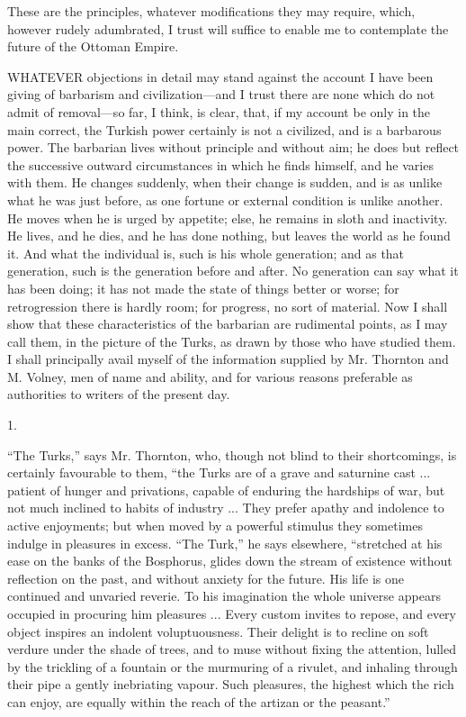 These are the principles,
whatever modifications they may require, which, however rudely
adumbrated, I trust will suffice to enable me to contemplate the
future of the Ottoman Empire.


WHATEVER
objections in detail may stand against the account I have been giving
of barbarism and civilization—and I trust there are none which do
not admit of removal—so far, I think, is clear, that, if my account
be only in the main correct, the Turkish power certainly is not a
civilized, and is a barbarous power. The barbarian lives without
principle and without aim; he does but reflect the successive outward
circumstances in which he finds himself, and he varies with them. He
changes suddenly, when their change is sudden, and is as unlike what
he was just before, as one fortune or external condition is unlike
another. He moves when he is urged by appetite; else, he remains in
sloth and inactivity. He lives, and he dies, and he has done nothing,
but leaves the world as he found it. And what the individual is, such
is his whole generation; and as that generation, such is the
generation before and after. No generation can say what it has been
doing; it has not made the state of things better or worse; for
retrogression there is hardly room; for progress, no sort of material.
Now I shall show that these characteristics of the barbarian are
rudimental points, as I may call them, in the picture of the Turks, as
drawn by those who have studied them. I shall principally avail myself
of the information supplied by Mr. Thornton and M. Volney, men
of name and ability, and for various reasons preferable as authorities
to writers of the present day.

1.

``The
Turks,'' says Mr. Thornton, who, though not blind to their
shortcomings, is certainly favourable to them, ``the Turks are of a
grave and saturnine cast ... patient of hunger and privations, capable
of enduring the hardships of war, but not much inclined to habits of
industry ... They prefer apathy and indolence to active enjoyments;
but when moved by a powerful stimulus they sometimes indulge in
pleasures in excess. ``The Turk,'' he says elsewhere, ``stretched at his
ease on the banks of the Bosphorus, glides down the stream of
existence without reflection on the past, and without anxiety for the
future. His life is one continued and unvaried reverie. To his
imagination the whole universe appears occupied in procuring him
pleasures ... Every custom invites to repose, and every object
inspires an indolent voluptuousness. Their delight is to recline on
soft verdure under the shade of trees, and to muse without fixing the
attention, lulled by the trickling of a fountain or the murmuring of a
rivulet, and inhaling through their pipe a gently inebriating vapour.
Such pleasures, the highest which the rich can enjoy, are equally
within the reach of the artizan or the peasant.''

